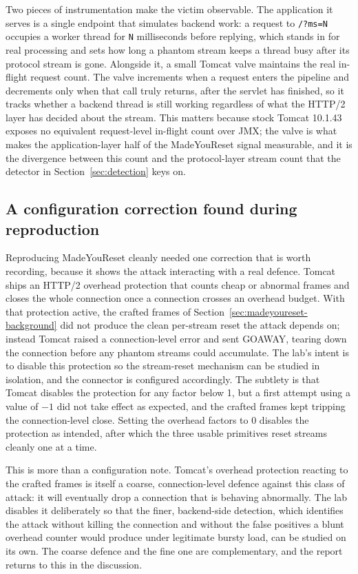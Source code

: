 \documentclass[a4paper,fleqn]{cas-dc}
\begin{document}
Two pieces of instrumentation make the victim observable. The application it serves is a single endpoint that simulates backend work: a request to \texttt{/?ms=N} occupies a worker thread for \texttt{N} milliseconds before replying, which stands in for real processing and sets how long a phantom stream keeps a thread busy after its protocol stream is gone. Alongside it, a small Tomcat valve maintains the real in-flight request count. The valve increments when a request enters the pipeline and decrements only when that call truly returns, after the servlet has finished, so it tracks whether a backend thread is still working regardless of what the HTTP/2 layer has decided about the stream. This matters because stock Tomcat 10.1.43 exposes no equivalent request-level in-flight count over JMX; the valve is what makes the application-layer half of the MadeYouReset signal measurable, and it is the divergence between this count and the protocol-layer stream count that the detector in Section~\ref{sec:detection} keys on.

\subsection{A configuration correction found during reproduction}\label{sec:overhead}

Reproducing MadeYouReset cleanly needed one correction that is worth recording, because it shows the attack interacting with a real defence. Tomcat ships an HTTP/2 overhead protection that counts cheap or abnormal frames and closes the whole connection once a connection crosses an overhead budget. With that protection active, the crafted frames of Section~\ref{sec:madeyoureset-background} did not produce the clean per-stream reset the attack depends on; instead Tomcat raised a connection-level error and sent GOAWAY, tearing down the connection before any phantom streams could accumulate. The lab's intent is to disable this protection so the stream-reset mechanism can be studied in isolation, and the connector is configured accordingly. The subtlety is that Tomcat disables the protection for any factor below 1, but a first attempt using a value of $-1$ did not take effect as expected, and the crafted frames kept tripping the connection-level close. Setting the overhead factors to 0 disables the protection as intended, after which the three usable primitives reset streams cleanly one at a time.

This is more than a configuration note. Tomcat's overhead protection reacting to the crafted frames is itself a coarse, connection-level defence against this class of attack: it will eventually drop a connection that is behaving abnormally. The lab disables it deliberately so that the finer, backend-side detection, which identifies the attack without killing the connection and without the false positives a blunt overhead counter would produce under legitimate bursty load, can be studied on its own. The coarse defence and the fine one are complementary, and the report returns to this in the discussion.
\end{document}
